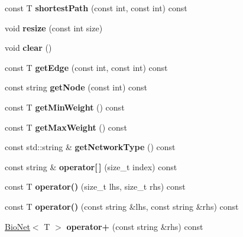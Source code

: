 \begin{DoxyCompactItemize}
const T {\bfseries shortest\+Path} (const int, const int) const
\item 
\mbox{\label{class_bio_net_a77de66d6eb37a030fc4f50670e9cd5f1}} 
void {\bfseries resize} (const int size)
\item 
\mbox{\label{class_bio_net_a7b85dcaa5264318e144dde4cfe3819af}} 
void {\bfseries clear} ()
\item 
\mbox{\label{class_bio_net_a3c6903721152c55f134d15d64868e1d1}} 
const T {\bfseries get\+Edge} (const int, const int) const
\item 
\mbox{\label{class_bio_net_ab174f91c9fb28e5ce0a1c99ab94f3296}} 
const string {\bfseries get\+Node} (const int) const
\item 
\mbox{\label{class_bio_net_ad62beca214bbd54dd3f250beb99532f9}} 
const T {\bfseries get\+Min\+Weight} () const
\item 
\mbox{\label{class_bio_net_a21d1879301feaa1c1a8f2b1d8ed82d6d}} 
const T {\bfseries get\+Max\+Weight} () const
\item 
\mbox{\label{class_bio_net_ac0563308f147e9006f738ec3798e9fa9}} 
const std\+::string \& {\bfseries get\+Network\+Type} () const
\item 
\mbox{\label{class_bio_net_a281c9319ff7017570be6e2e880af8b43}} 
const string \& {\bfseries operator\mbox{[}$\,$\mbox{]}} (size\+\_\+t index) const
\item 
\mbox{\label{class_bio_net_a14e7e57741f35c5878f2d233e19dab98}} 
const T {\bfseries operator()} (size\+\_\+t lhs, size\+\_\+t rhs) const
\item 
\mbox{\label{class_bio_net_aad6bff84a85602a8a981e67ce47d73f7}} 
const T {\bfseries operator()} (const string \&lhs, const string \&rhs) const
\item 
\mbox{\label{class_bio_net_a710924bcbc04475b16aea6cdd1f11697}} 
\hyperlink{class_bio_net}{Bio\+Net}$<$ T $>$ {\bfseries operator+} (const string \&rhs) const

\end{DoxyCompactItemize}
